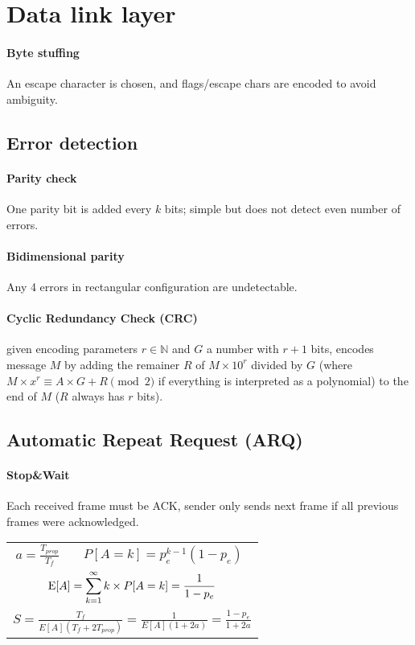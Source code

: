 \documentclass{form}
\begin{document}
\begin{minipage}[c]{0.41\textwidth}
    \section*{Data link layer}

    \paragraph{Byte stuffing}
    An escape character is chosen, and flags/escape chars are encoded to avoid ambiguity.

    \subsection*{Error detection}
    \paragraph{Parity check}
    One parity bit is added every $k$ bits; simple but does not detect even number of errors.

    \paragraph{Bidimensional parity}
    Any 4 errors in rectangular configuration are undetectable.

    \paragraph{Cyclic Redundancy Check (CRC)}
    given encoding parameters $r \in \mathbb{N}$ and $G$ a number with $r+1$ bits, encodes message $M$ by adding the remainer $R$  of $M \times 10^{r}$ divided by $G$ (where $M \times x^r \equiv A\times G + R \pmod{2}$ if everything is interpreted as a polynomial) to the end of $M$ ($R$ always has $r$ bits).


    \subsection*{Automatic Repeat Request (ARQ)}
    \paragraph{Stop\&Wait}
    Each received frame must be ACK, sender only sends next frame if all previous frames were acknowledged.
    \begin{center}
        \begin{tabular}{c c}
            $\displaystyle a = \frac{T_{prop}}{T_f}$ & $\displaystyle P[A=k] = p_e^{k-1} (1-p_e)$ \\
            \multicolumn{2}{c}{$\displaystyle \operatorname{E}[A] = \sum_{k=1}^{\infty}{k \times P[A=k]} = \frac{1}{1-p_e}$} \\
            \multicolumn{2}{c}{$\displaystyle S            = \frac{T_f}{E[A](T_f+2T_{prop})} = \frac{1}{E[A](1+2a)} = \frac{1-p_e}{1+2a}$}
        \end{tabular}
    \end{center}
\end{minipage}
\end{document}

